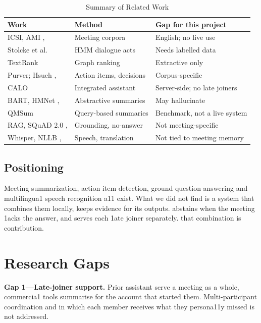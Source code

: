 \documentclass[conference]{IEEEtran}
\begin{document}
\begin{table}[htbp]
\caption{Summary of Related Work}
\centering
\footnotesize
\begin{tabular}{|L{2.6cm}|L{2.2cm}|L{2.6cm}|}
\hline
\textbf{Work} & \textbf{Method} & \textbf{Gap for this project} \\
\hline
ICSI, AMI \cite{b1}, \cite{b2} & Meeting corpora & English; no live use \\
\hline
Stolcke et al. \cite{b3} & HMM dialogue acts & Needs labelled data \\
\hline
TextRank \cite{b5} & Graph ranking & Extractive only \\
\hline
Purver; Hsueh \cite{b7}, \cite{b8} & Action items, decisions & Corpus-specific \\
\hline
CALO \cite{b9} & Integrated assistant & Server-side; no late joiners \\
\hline
BART, HMNet \cite{b12}, \cite{b14} & Abstractive summaries & May hallucinate \cite{b16} \\
\hline
QMSum \cite{b15} & Query-based summaries & Benchmark, not a live system \\
\hline
RAG, SQuAD 2.0 \cite{b17}, \cite{b18} & Grounding, no-answer & Not meeting-specific \\
\hline
Whisper, NLLB \cite{b24}, \cite{b25} & Speech, translation & Not tied to meeting memory \\
\hline
\end{tabular}
\end{table}

\subsection{Positioning}
Meeting summarization, action item detection, ground question answering and multilingua1 speech recognition a11 exist. What we did not find is a system that combines them locally, keeps evidence for its outputs. abstains when the meeting 1acks the answer, and serves each 1ate joiner separately. that combination is contribution.

\section{Research Gaps}
\textbf{Gap 1---Late-joiner support.} Prior assistant \cite{b9} serve a meeting as a whole, commercia1 tools summarise for the account that started them. Multi-participant coordination and in which each member receives what they persona11y missed is not addressed.
\end{document}
